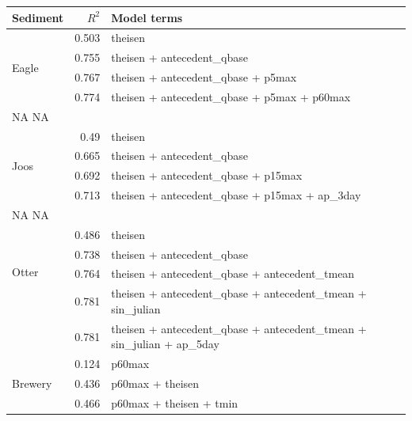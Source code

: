 \documentclass[12pt]{article}
\begin{document}
\begin{table}[h] \small
    \begin{center}
    \begin{tabular}{lrl}
    \textbf{Sediment} & $R^2$ & Model terms \\
    \hline
    \multirow{4}{*}{Eagle} & 0.503 & theisen\\
    & 0.755 & theisen + antecedent\_qbase\\
    & 0.767 & theisen + antecedent\_qbase + p5max\\
    & 0.774 & theisen + antecedent\_qbase + p5max + p60max \\
NA
NA
    \vspace{2mm}\\
    \multirow{4}{*}{Joos} & 0.49 & theisen\\
    & 0.665 & theisen + antecedent\_qbase\\
    & 0.692 & theisen + antecedent\_qbase + p15max\\
    & 0.713 & theisen + antecedent\_qbase + p15max + ap\_3day \\
NA
NA
    \vspace{2mm}\\
    \multirow{4}{*}{Otter} & 0.486 & theisen\\
    & 0.738 & theisen + antecedent\_qbase\\
    & 0.764 & theisen + antecedent\_qbase + antecedent\_tmean\\
    & 0.781 & theisen + antecedent\_qbase + antecedent\_tmean + sin\_julian \\
    & 0.781 & theisen + antecedent\_qbase + antecedent\_tmean + sin\_julian + ap\_5day
    \vspace{2mm}\\
    \multirow{3}{*}{Brewery} & 0.124 & p60max\\
    & 0.436 & p60max + theisen\\
    & 0.466 & p60max + theisen + tmin
    \vspace{6mm}\\


\end{tabular}
\end{center}
\end{table}
\end{document}
